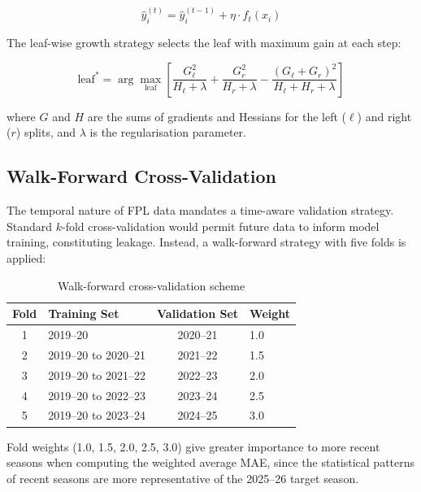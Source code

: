 \begin{equation}
\hat{y}_i^{(t)} = \hat{y}_i^{(t-1)} + \eta \cdot f_t(x_i)
\end{equation}

The leaf-wise growth strategy selects the leaf with maximum gain at each step:

\begin{equation}
\text{leaf}^* = \arg\max_{\text{leaf}} \left[ \frac{G_\ell^2}{H_\ell + \lambda} + \frac{G_r^2}{H_r + \lambda} - \frac{(G_\ell + G_r)^2}{H_\ell + H_r + \lambda} \right]
\end{equation}

where $G$ and $H$ are the sums of gradients and Hessians for the left ($\ell$) and right ($r$) splits, and $\lambda$ is the regularisation parameter.

\subsection{Walk-Forward Cross-Validation}

The temporal nature of FPL data mandates a time-aware validation strategy. Standard $k$-fold cross-validation would permit future data to inform model training, constituting leakage. Instead, a walk-forward strategy with five folds is applied:

\begin{table}[h]
\centering
\caption{Walk-forward cross-validation scheme}
\label{tab:walkforward_en}
\begin{tabular}{clcl}
\toprule
\textbf{Fold} & \textbf{Training Set} & \textbf{Validation Set} & \textbf{Weight} \\
\midrule
1 & 2019--20                      & 2020--21 & 1.0 \\
2 & 2019--20 to 2020--21          & 2021--22 & 1.5 \\
3 & 2019--20 to 2021--22          & 2022--23 & 2.0 \\
4 & 2019--20 to 2022--23          & 2023--24 & 2.5 \\
5 & 2019--20 to 2023--24          & 2024--25 & 3.0 \\
\bottomrule
\end{tabular}
\end{table}

Fold weights (1.0, 1.5, 2.0, 2.5, 3.0) give greater importance to more recent seasons when computing the weighted average MAE, since the statistical patterns of recent seasons are more representative of the 2025--26 target season.

